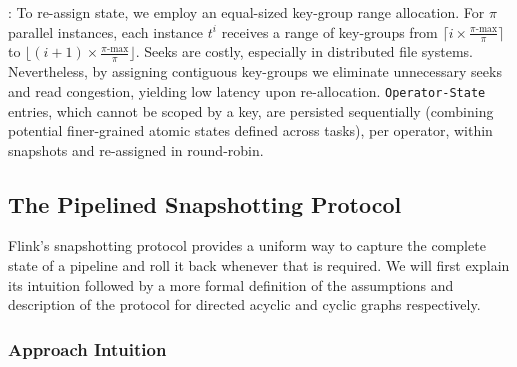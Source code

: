 : To re-assign state, we employ an equal-sized  key-group range allocation. For $\pi$ parallel instances, each instance $t^i$ receives a range of key-groups from $\lceil i \times \frac{\pi\text{-max}}{\pi} \rceil$ to $\lfloor (i+1) \times \frac{\pi\text{-max}}{\pi} \rfloor$. Seeks are costly, especially in distributed file systems. Nevertheless, by assigning contiguous key-groups we eliminate unnecessary seeks and read congestion, yielding low latency upon re-allocation. 
\texttt{Operator-State} entries, which cannot be scoped by a key, are persisted sequentially (combining potential finer-grained atomic states defined across tasks), per operator, within snapshots and re-assigned in round-robin.


\subsection{The Pipelined Snapshotting Protocol}
\label{sec:snapshots}

Flink's snapshotting protocol provides a uniform way to capture the complete state of a pipeline and roll it back whenever that is required. We will first explain its intuition followed by a more formal definition of the assumptions and description of the protocol for directed acyclic and cyclic graphs respectively.


\subsubsection{Approach Intuition}

